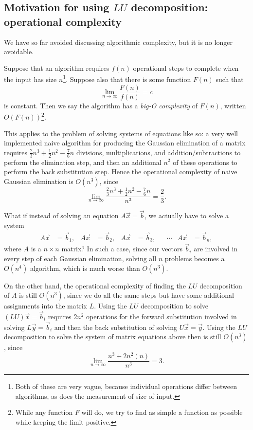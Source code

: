 \documentclass[m3380-lec-main.tex]{subfiles}
\begin{document}
\subsection{Motivation for using $LU$ decomposition: operational complexity}

We have so far avoided discussing algorithmic complexity, but it is no longer avoidable.

\begin{defn} Suppose that an algorithm requires $f(n)$ operational steps to complete when the input has size $n$\footnote{Both of these are very vague, because individual operations differ between algorithms, as does the measurement of size of input.}. Suppose also that there is some function $F(n)$ such that 
\[ \lim_{n\to\infty} \frac{F(n)}{f(n)} = c \] is constant. Then we say the algorithm has a \emph{big-O complexity} of $F(n)$, written $O(F(n))$\footnote{While any function $F$ will do, we try to find as simple a function as possible while keeping the limit positive.}.
\end{defn}

This applies to the problem of solving systems of equations like so: a very well implemented naive algorithm for producing the Gaussian elimination of a matrix requires $\frac23n^3+\frac12n^2-\frac76n$ divisions, multiplications, and addition/subtractions to perform the elimination step, and then an additional $n^2$ of these operations to perform the back substitution step. Hence the operational complexity of naive Gaussian elimination is $O(n^3)$, since
\[ \lim_{n\to\infty}\frac{\frac23n^3+\frac12n^2-\frac76n}{n^3} = \frac23. \]

What if instead of solving an equation $A\vec{x}=\vec{b}$, we actually have to solve a system
\begin{align*}
A\vec{x}&=\vec{b}_1, &
A\vec{x}&=\vec{b}_2, &
A\vec{x}&=\vec{b}_3, &
&\cdots &
A\vec{x}&=\vec{b}_n,
\end{align*}
where $A$ is a $n\times n$ matrix? In such a case, since our vectors $\vec{b}_i$ are involved in every step of each Gaussian elimination, solving all $n$ problems becomes a $O(n^4)$ algorithm, which is much worse than $O(n^3)$.

On the other hand, the operational complexity of finding the $LU$ decomposition of $A$ is still $O(n^3)$, since we do all the same steps but have some additional assignments into the matrix $L$. Using the $LU$ decomposition to solve $(LU)\vec{x}=\vec{b}_i$ requires $2n^2$ operations for the forward substitution involved in solving $L\vec{y}=\vec{b}_i$ and then the back substitution of solving $U\vec{x}=\vec{y}$. Using the $LU$ decomposition to solve the system of matrix equations above then is still $O(n^3)$, since
\[\lim_{n\to\infty}\frac{n^3+2n^2(n)}{n^3} = 3.\]
\end{document}
